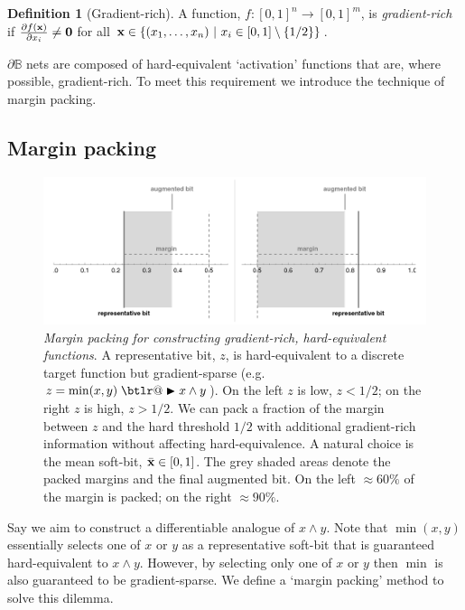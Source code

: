 \documentclass{article}
\makeatletter
\theoremstyle{plain}
\theoremstyle{definition}
\newtheorem{definition}[theorem]{Definition}
\theoremstyle{remark}
\DeclareRobustCommand{\btright}{\mathrel{\mathpalette\btlr@\blacktriangleright}}
\newcommand{\btlr@}[2]{%
	\begingroup
	\sbox\z@{$\m@th#1\triangleright$}%
	\sbox\tw@{\resizebox{1.1\wd\z@}{1.1\ht\z@}{\raisebox{\depth}{$\m@th#1\mkern-1mu#2$}}}%
	\ht\tw@=\ht\z@ \dp\tw@=\dp\z@ \wd\tw@=\wd\z@
	\copy\tw@
	\endgroup
}
\makeatother
\begin{document}
\begin{definition}[Gradient-rich]
	A function, $f: [0,1]^n \rightarrow [0,1]^m$, is {\em gradient-rich} if $\frac{\partial f({\bf x})}{\partial x_{i}} \neq {\bf 0}$ for all ${\bf x} \in \{(x_{1}, \dots, x_{n}) ~|~ x_{i} \in [0,1] \setminus \{1/2\}\}$.
\end{definition}

$\partial \mathbb{B}$ nets are composed of hard-equivalent `activation' functions that are, where possible, gradient-rich. To meet this requirement we introduce the technique of margin packing.

\subsection{Margin packing}

\begin{figure}[t!]
	\centering
	\includegraphics[trim=30pt 5pt 30pt 10pt, clip, width=.49\textwidth]{../margin-trick.png}
	\caption{{\em Margin packing for constructing gradient-rich, hard-equivalent functions}. A representative bit, $z$, is hard-equivalent to a discrete target function but gradient-sparse (e.g. $z=\operatorname{min}(x,y) \btright x \wedge y$). On the left $z$ is low, $z<1/2$; on the right $z$ is high, $z>1/2$. We can pack a fraction of the margin between $z$ and the hard threshold $1/2$ with additional gradient-rich information without affecting hard-equivalence. A natural choice is the mean soft-bit, $\bar{\bf x} \in [0,1]$. The grey shaded areas denote the packed margins and the final augmented bit. On the left $\approx 60\%$ of the margin is packed; on the right $\approx 90\%$.}
	\label{fig:margin-trick}
\end{figure}

Say we aim to construct a differentiable analogue of $x \wedge y$. Note that $\operatorname{min}(x,y)$ essentially selects one of $x$ or $y$ as a representative soft-bit that is guaranteed hard-equivalent to $x \wedge y$. However, by selecting only one of $x$ or $y$ then $\operatorname{min}$ is also guaranteed to be gradient-sparse. We define a `margin packing' method to solve this dilemma.
\end{document}
